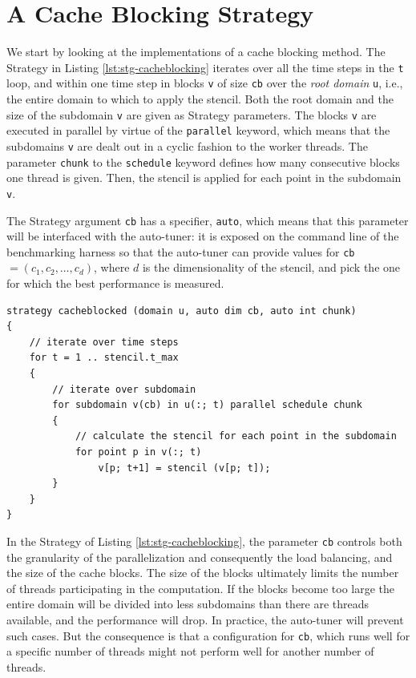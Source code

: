 \section{A Cache Blocking Strategy}

We start by looking at the implementations of a cache blocking method.
The Strategy in Listing \ref{lst:stg-cacheblocking} iterates over all the time steps in the \texttt{t} loop,
and within one time step in blocks \texttt{v} of size \texttt{cb} over the {\em root domain} \texttt{u},
i.e., the entire domain to which to apply the stencil.
Both the root domain and the size of the subdomain \texttt{v} are given as Strategy parameters.
The blocks \texttt{v} are executed in parallel by virtue of the \texttt{parallel} keyword, which means that
the subdomains \texttt{v} are dealt out in a cyclic fashion to the worker threads. The parameter \texttt{chunk}
to the \texttt{schedule} keyword defines how many consecutive blocks one thread is given.
Then, the stencil is applied for each point in the subdomain \texttt{v}.

The Strategy argument \texttt{cb} has a specifier, \texttt{auto}, which means that this parameter will be interfaced
with the auto-tuner: it is exposed on the command line of the benchmarking harness so that the auto-tuner can
provide values for \texttt{cb}$=(c_1,c_2,\dots,c_d)$, where $d$ is the dimensionality of the stencil,
and pick the one for which the best performance is measured.

\begin{lstlisting}[language=strategy, label=lst:stg-cacheblocking, caption={A cache blocking Strategy implementation.}]
strategy cacheblocked (domain u, auto dim cb, auto int chunk)
{
	// iterate over time steps 
	for t = 1 .. stencil.t_max
	{
		// iterate over subdomain
		for subdomain v(cb) in u(:; t) parallel schedule chunk
		{
			// calculate the stencil for each point in the subdomain
			for point p in v(:; t)
				v[p; t+1] = stencil (v[p; t]);
		}
	}
}
\end{lstlisting}

In the Strategy of Listing \ref{lst:stg-cacheblocking}, the parameter \texttt{cb} controls both the granularity
of the parallelization and consequently the load balancing, and the size of the cache blocks.
The size of the blocks ultimately limits the number of threads participating in the computation.
If the blocks become too large the entire domain will be divided into less subdomains than there are threads
available, and the performance will drop. In practice, the auto-tuner will prevent such cases.
But the consequence is that a configuration for \texttt{cb}, which runs well for a specific number of threads
might not perform well for another number of threads.

